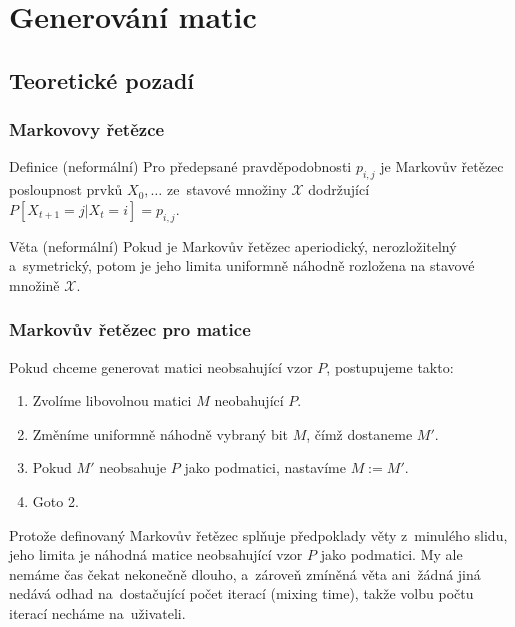 \documentclass{beamer}
\begin{document}

\section{Generování matic}
\subsection{Teoretické pozadí}
\begin{frame}
\frametitle{Markovovy řetězce}
\begin{block}{Definice (neformální)}
Pro předepsané pravděpodobnosti $p_{i,j}$ je \alert{Markovův řetězec} posloupnost prvků $X_0,\dots$ ze~stavové množiny $\mathcal{X}$ dodržující $P[X_{t+1}=j|X_t=i]=p_{i,j}.$
\end{block}
\pause
\begin{block}{Věta (neformální)}
Pokud je Markovův řetězec aperiodický, nerozložitelný a~symetrický, potom je jeho limita uniformně náhodně rozložena na stavové množině $\mathcal{X}$.
\end{block}
\end{frame}

\begin{frame}
\frametitle{Markovův řetězec pro matice}
Pokud chceme generovat matici neobsahující vzor $P$, postupujeme takto:
\begin{enumerate}
\item Zvolíme libovolnou matici $M$ neobahující $P$.
\item Změníme uniformně náhodně vybraný bit $M$, čímž dostaneme $M'$.
\item \alert{Pokud $M'$ neobsahuje $P$ jako podmatici}, nastavíme $M:=M'$.
\item Goto 2.
\end{enumerate}
\vspace{1em}
\pause
Protože definovaný Markovův řetězec splňuje předpoklady věty z~minulého slidu, jeho limita je náhodná matice neobsahující vzor $P$ jako podmatici. My ale nemáme čas čekat nekonečně dlouho, a~zároveň zmíněná věta ani~žádná jiná nedává odhad na~dostačující počet iterací (mixing time), takže volbu počtu iterací necháme na~uživateli.
\end{frame}
\end{document}
